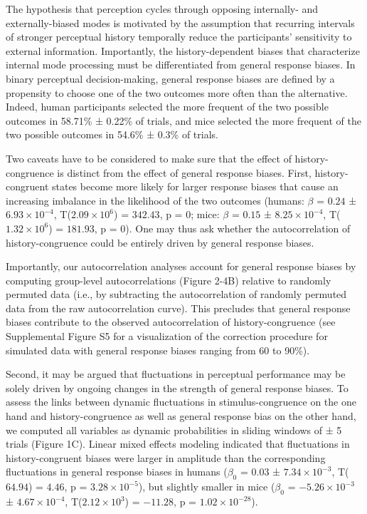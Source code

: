 \documentclass[
]{article}
\begin{document}
The hypothesis that perception cycles through opposing internally- and
externally-biased modes is motivated by the assumption that recurring
intervals of stronger perceptual history temporally reduce the
participants' sensitivity to external information. Importantly, the
history-dependent biases that characterize internal mode processing must
be differentiated from general response biases. In binary perceptual
decision-making, general response biases are defined by a propensity to
choose one of the two outcomes more often than the alternative. Indeed,
human participants selected the more frequent of the two possible
outcomes in 58.71\% ± 0.22\% of trials, and mice selected the more
frequent of the two possible outcomes in 54.6\% ± 0.3\% of trials.

Two caveats have to be considered to make sure that the effect of
history-congruence is distinct from the effect of general response
biases. First, history-congruent states become more likely for larger
response biases that cause an increasing imbalance in the likelihood of
the two outcomes (humans: \(\beta\) = \(0.24\) ±
\(\ensuremath{6.93\times 10^{-4}}\),
T(\(\ensuremath{2.09\times 10^{6}}\)) = \(342.43\), p = \(0\); mice:
\(\beta\) = \(0.15\) ± \(\ensuremath{8.25\times 10^{-4}}\),
T(\(\ensuremath{1.32\times 10^{6}}\)) = \(181.93\), p = \(0\)). One may
thus ask whether the autocorrelation of history-congruence could be
entirely driven by general response biases.

Importantly, our autocorrelation analyses account for general response
biases by computing group-level autocorrelations (Figure 2-4B) relative
to randomly permuted data (i.e., by subtracting the autocorrelation of
randomly permuted data from the raw autocorrelation curve). This
precludes that general response biases contribute to the observed
autocorrelation of history-congruence (see Supplemental Figure S5 for a
visualization of the correction procedure for simulated data with
general response biases ranging from 60 to 90\%).

Second, it may be argued that fluctuations in perceptual performance may
be solely driven by ongoing changes in the strength of general response
biases. To assess the links between dynamic fluctuations in
stimulus-congruence on the one hand and history-congruence as well as
general response bias on the other hand, we computed all variables as
dynamic probabilities in sliding windows of ± 5 trials (Figure 1C).
Linear mixed effects modeling indicated that fluctuations in
history-congruent biases were larger in amplitude than the corresponding
fluctuations in general response biases in humans (\(\beta_0\) =
\(0.03\) ± \(\ensuremath{7.34\times 10^{-3}}\), T(\(64.94\)) = \(4.46\),
p = \(\ensuremath{3.28\times 10^{-5}}\)), but slightly smaller in mice
(\(\beta_0\) = \(\ensuremath{-5.26\times 10^{-3}}\) ±
\(\ensuremath{4.67\times 10^{-4}}\),
T(\(\ensuremath{2.12\times 10^{3}}\)) = \(-11.28\), p =
\(\ensuremath{1.02\times 10^{-28}}\)).
\end{document}
